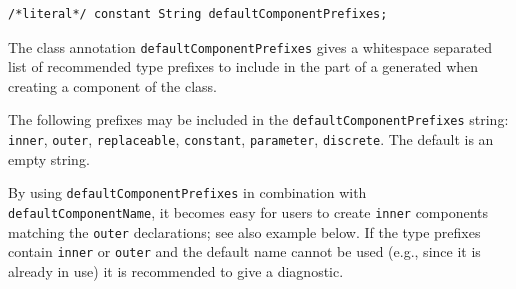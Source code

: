\begin{annotationdefinition}[defaultComponentPrefixes]
\begin{synopsis}\begin{lstlisting}
/*literal*/ constant String defaultComponentPrefixes;
\end{lstlisting}\end{synopsis}
\begin{semantics}
The class annotation \lstinline!defaultComponentPrefixes! gives a whitespace separated list of recommended type prefixes to include in the  part of a  generated when creating a component of the class.

The following prefixes may be included in the \lstinline!defaultComponentPrefixes! string: \lstinline!inner!, \lstinline!outer!, \lstinline!replaceable!, \lstinline!constant!, \lstinline!parameter!, \lstinline!discrete!.
The default is an empty string.

\begin{nonnormative}
By using \lstinline!defaultComponentPrefixes! in combination with \lstinline!defaultComponentName!, it becomes easy for users to create \lstinline!inner! components matching the \lstinline!outer! declarations; see also example below.
If the type prefixes contain \lstinline!inner! or \lstinline!outer! and the default name cannot be used (e.g., since it is already in use) it is recommended to give a diagnostic.
\end{nonnormative}
\end{semantics}
\end{annotationdefinition}

